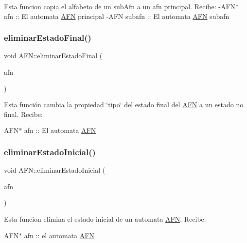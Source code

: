 Esta funcion copia el alfabeto de un sub\+Afn a un afn principal. Recibe\+: -\/\+A\+F\+N$\ast$ afn \+:\+: El automata \hyperlink{class_a_f_n}{A\+FN} principal -\/\+A\+FN subafn \+:\+: El automata \hyperlink{class_a_f_n}{A\+FN} subafn \mbox{\label{class_a_f_n_a9585f1a106bc12c61682025cf3bce1f7}} 
\subsubsection{\texorpdfstring{eliminar\+Estado\+Final()}{eliminarEstadoFinal()}}
{\footnotesize\ttfamily void A\+F\+N\+::eliminar\+Estado\+Final (\begin{DoxyParamCaption}\item[{\hyperlink{class_a_f_n}{A\+FN} $\ast$}]{afn }\end{DoxyParamCaption})}

Esta función cambia la propiedad \char`\"{}tipo\char`\"{} del estado final del \hyperlink{class_a_f_n}{A\+FN} a un estado no final. Recibe\+:
\begin{DoxyItemize}
\item A\+F\+N$\ast$ afn \+:\+: El automata \hyperlink{class_a_f_n}{A\+FN} 
\end{DoxyItemize}\mbox{\label{class_a_f_n_a13782c7d882786a73b35e289d75c9c61}} 
\subsubsection{\texorpdfstring{eliminar\+Estado\+Inicial()}{eliminarEstadoInicial()}}
{\footnotesize\ttfamily void A\+F\+N\+::eliminar\+Estado\+Inicial (\begin{DoxyParamCaption}\item[{\hyperlink{class_a_f_n}{A\+FN} $\ast$}]{afn }\end{DoxyParamCaption})}

Esta funcion elimina el estado inicial de un automata \hyperlink{class_a_f_n}{A\+FN}. Recibe\+:
\begin{DoxyItemize}
\item A\+F\+N$\ast$ afn \+:\+: el automata \hyperlink{class_a_f_n}{A\+FN} 
\end{DoxyItemize}\mbox{\label{class_a_f_n_a12af101cefe7072f22f9bd52442c4167}} 
